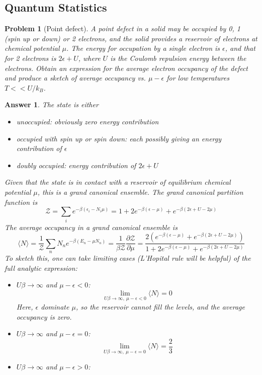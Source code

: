 \documentclass[a4paper]{article}
\theoremstyle{new2}
\newtheorem{ans}{Answer}[section]
\theoremstyle{new}
\newtheorem{qns}{Problem}[section]
\begin{document}
\subsection*{Quantum Statistics}
\begin{qns}[Point defect]
A point defect in a solid may be occupied by 0, 1 (spin up or down) or 2 electrons, and the solid provides a reservoir of electrons at chemical potential $\mu$. The energy for occupation by a single electron is $\epsilon$, and that for 2 electrons is $2\epsilon+U$, where $U$ is the Coulomb repulsion energy between the electrons. Obtain an expression for the average electron occupancy of the defect and produce a sketch of average occupancy vs. $\mu-\epsilon$ for low temperatures $T << U/k_B$.
\end{qns}
\begin{ans}
The state is either
\begin{itemize}
    \item unoccupied: obviously zero energy contribution
    \item occupied with spin up or spin down: each possibly giving an energy contribution of $\epsilon$
    \item doubly occupied: energy contribution of $2\epsilon+U$
\end{itemize}
Given that the state is in contact with a reservoir of equilibrium chemical potential $\mu$, this is a grand canonical ensemble. The grand canonical partition function is
$$\mathcal{Z}=\sum_ie^{-\beta(\epsilon_i-N_i\mu)}=1+2e^{-\beta(\epsilon-\mu)}+e^{-\beta(2\epsilon+U-2\mu)}$$
The average occupancy in a grand canonical ensemble is
$$\langle N\rangle=\frac{1}{\mathcal{Z}}\sum_nN_ne^{-\beta(E_n-\mu N_n)}=\frac{1}{\beta\mathcal{Z}}\frac{\partial\mathcal{Z}}{\partial\mu}=\frac{2(e^{-\beta(\epsilon-\mu)}+e^{-\beta(2\epsilon+U-2\mu)})}{1+2e^{-\beta(\epsilon-\mu)}+e^{-\beta(2\epsilon+U-2\mu)}}$$
To sketch this, one can take limiting cases (L'Hopital rule will be helpful) of the full analytic expression:
\begin{itemize}
    \item $U\beta\rightarrow\infty$ and $\mu-\epsilon<0$:
    $$\lim_{U\beta\rightarrow\infty,~\mu-\epsilon<0}\langle N\rangle=0$$
    Here, $\epsilon$ dominate $\mu$, so the reservoir cannot fill the levels, and the average occupancy is zero.
    \item $U\beta\rightarrow\infty$ and $\mu-\epsilon=0$: 
    $$\lim_{U\beta\rightarrow\infty,~\mu-\epsilon=0}\langle N\rangle=\frac{2}{3}$$
    \item $U\beta\rightarrow\infty$ and $\mu-\epsilon>0$: 

\end{itemize}
\end{ans}
\end{document}
